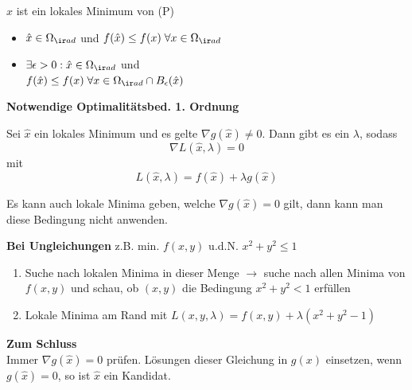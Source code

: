 \begin{emphbox}
    $\hat x$ ist ein lokales Minimum von (P) \\
    \begin{itemize}
        \item[$\Rightarrow$] $\hat x \in \Omega_{\ir ad}$ und $f(\hat x) \le f(x) \; \forall x \in \Omega_{\ir ad}$
        \item[$\Rightarrow$] $\exists \epsilon > 0: \hat x \in \Omega_{\ir ad}$ und \\
              $f(\hat x) \le f(x) \; \forall x \in \Omega_{\ir ad} \cap B_\epsilon(\hat x)$
    \end{itemize}
\end{emphbox}

\vspace{2mm}
\textbf{Notwendige Optimalitätsbed. 1. Ordnung}
\begin{sectionbox}
    Sei $\hat x$ ein lokales Minimum und es gelte $\nabla g(\hat x)\ne 0$. Dann gibt es ein $\lambda$, sodass
    \begin{equation*}
        \nabla L(\hat x, \lambda) = 0
    \end{equation*}
    mit
    \begin{equation*}
        L(\hat x, \lambda) = f(\hat x) + \lambda g(\hat x)
    \end{equation*}
\end{sectionbox}

Es kann auch lokale Minima geben, welche $\nabla g(\hat x)=0$ gilt, dann kann man diese Bedingung nicht anwenden. \\
\begin{sectionbox}
    \textbf{Bei Ungleichungen} z.B. min. $f(x,y)$ u.d.N. $x^2 + y^2 \le 1$
    \begin{enumerate}
        \item Suche nach lokalen Minima in dieser Menge $\rightarrow$ suche nach allen Minima von $f(x,y)$ und schau, ob $(x,y)$ die Bedingung $x^2+y^2 < 1$ erfüllen
        \item Lokale Minima am Rand mit $L(x,y,\lambda)=f(x,y) + \lambda(x^2+y^2-1)$
    \end{enumerate}
\end{sectionbox}

\textbf{Zum Schluss} \\
Immer $\nabla g(\hat x)=0$ prüfen. Lösungen dieser Gleichung in $g(x)$ einsetzen, wenn $g(\hat x)=0$, so ist $\hat x$ ein Kandidat.
